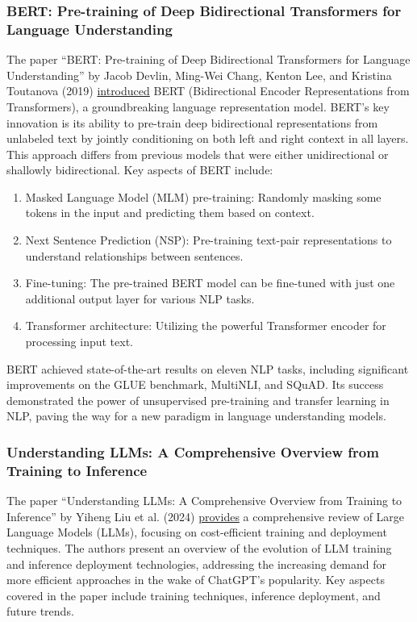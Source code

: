 \documentclass{article}
\begin{document}
\subsubsection*{BERT: Pre-training of Deep Bidirectional Transformers for Language Understanding}

The paper ``BERT: Pre-training of Deep Bidirectional Transformers for Language Understanding'' by Jacob Devlin, Ming-Wei Chang, Kenton Lee, and Kristina Toutanova (2019) \href{https://aclanthology.org/N19-1423/}{introduced} BERT (Bidirectional Encoder Representations from Transformers), a groundbreaking language representation model.\cite{Devlin2019} BERT's key innovation is its ability to pre-train deep bidirectional representations from unlabeled text by jointly conditioning on both left and right context in all layers. This approach differs from previous models that were either unidirectional or shallowly bidirectional.
Key aspects of BERT include:
\begin{enumerate}
    \item Masked Language Model (MLM) pre-training: Randomly masking some tokens in the input and predicting them based on context.
    \item Next Sentence Prediction (NSP): Pre-training text-pair representations to understand relationships between sentences.
    \item Fine-tuning: The pre-trained BERT model can be fine-tuned with just one additional output layer for various NLP tasks.
    \item Transformer architecture: Utilizing the powerful Transformer encoder for processing input text.
\end{enumerate}

BERT achieved state-of-the-art results on eleven NLP tasks, including significant improvements on the GLUE benchmark, MultiNLI, and SQuAD. Its success demonstrated the power of unsupervised pre-training and transfer learning in NLP, paving the way for a new paradigm in language understanding models.

\subsubsection*{Understanding LLMs: A Comprehensive Overview from Training to Inference}

The paper ``Understanding LLMs: A Comprehensive Overview from Training to Inference'' by Yiheng Liu et al. (2024) \href{https://arxiv.org/abs/2401.02038}{provides} a comprehensive review of Large Language Models (LLMs), focusing on cost-efficient training and deployment techniques. The authors present an overview of the evolution of LLM training and inference deployment technologies, addressing the increasing demand for more efficient approaches in the wake of ChatGPT's popularity. Key aspects covered in the paper include training techniques, inference deployment, and future trends.
\end{document}
